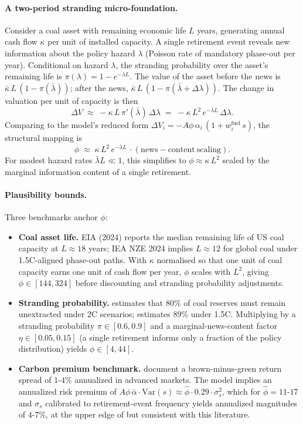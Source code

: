 \documentclass[12pt,a4paper]{article}
\begin{document}
\paragraph{A two-period stranding micro-foundation.} Consider a coal asset with remaining economic life $L$ years, generating annual cash flow $\kappa$ per unit of installed capacity. A single retirement event reveals new information about the policy hazard $\lambda$ (Poisson rate of mandatory phase-out per year). Conditional on hazard $\lambda$, the stranding probability over the asset's remaining life is $\pi(\lambda) = 1 - e^{-\lambda L}$. The value of the asset before the news is $\bar\kappa\, L\,(1 - \pi(\bar\lambda))$; after the news, $\bar\kappa\, L\,(1 - \pi(\bar\lambda + \Delta\lambda))$. The change in valuation per unit of capacity is then
\[
\Delta V \;\approx\; -\kappa\, L\, \pi'(\bar\lambda)\,\Delta\lambda \;=\; -\kappa\, L^2\, e^{-\bar\lambda L}\,\Delta\lambda.
\]
Comparing to the model's reduced form $\Delta V_i = -A\phi\,\alpha_i\,(1 + w^{\mathrm{fuel}}_i\,s)$, the structural mapping is
\[
\phi \;\approx\; \kappa\, L^2\, e^{-\bar\lambda L}\, \cdot \mathrm{(news-content\ scaling)}.
\]
For modest hazard rates $\bar\lambda L \ll 1$, this simplifies to $\phi \approx \kappa\, L^2$ scaled by the marginal information content of a single retirement.

\paragraph{Plausibility bounds.} Three benchmarks anchor $\phi$:
\begin{itemize}
    \item \textbf{Coal asset life.} EIA (2024) reports the median remaining life of US coal capacity at $L \approx 18$ years; IEA NZE 2024 implies $L \approx 12$ for global coal under 1.5C-aligned phase-out paths. With $\kappa$ normalised so that one unit of coal capacity earns one unit of cash flow per year, $\phi$ scales with $L^2$, giving $\phi \in [144, 324]$ before discounting and stranding probability adjustments.
    \item \textbf{Stranding probability.} \citet{McGlade2015} estimates that 80\% of coal reserves must remain unextracted under 2C scenarios; \citet{Welsby2021} estimates 89\% under 1.5C. Multiplying by a stranding probability $\pi \in [0.6, 0.9]$ and a marginal-news-content factor $\eta \in [0.05, 0.15]$ (a single retirement informs only a fraction of the policy distribution) yields $\phi \in [4, 44]$.
    \item \textbf{Carbon premium benchmark.} \citet{BoltonKacperczyk2023} document a brown-minus-green return spread of $1\text{-}4\%$ annualized in advanced markets. The model implies an annualized risk premium of $A\phi\,\bar\alpha \cdot \mathrm{Var}(s) \approx \hat\phi \cdot 0.29 \cdot \sigma_s^2$, which for $\hat\phi = 11\text{-}17$ and $\sigma_s$ calibrated to retirement-event frequency yields annualized magnitudes of $4\text{-}7\%$, at the upper edge of but consistent with this literature.
\end{itemize}
\end{document}
